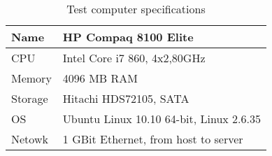 \begin{table}
  \centering
  \caption{Test computer specifications}
  \begin{tabular}{ | l | l |}
    \hline
    Name    & HP Compaq 8100 Elite                \\ \hline
    CPU     & Intel Core i7 860, 4x2,80GHz        \\ \hline
    Memory  & 4096 MB \ac{RAM}                   \\ \hline
    Storage & Hitachi HDS72105, SATA          \\ \hline
    \ac{OS} & Ubuntu Linux 10.10 64-bit, Linux 2.6.35 \\ \hline
    Netowk  & 1 GBit Ethernet, from host to server \\ \hline
  \end{tabular}
  \label{tbl:device:computer}
\end{table}
